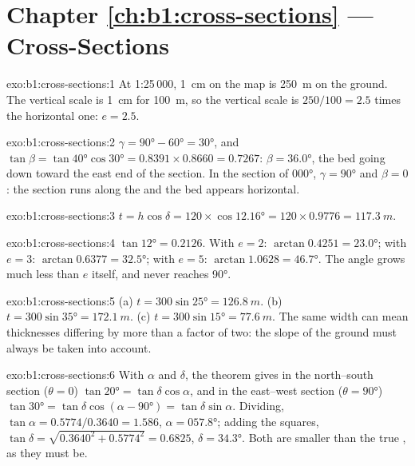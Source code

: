 \section*{Chapter \ref{ch:b1:cross-sections} --- Cross-Sections}

\begin{solution}{exo:b1:cross-sections:1}
At 1:25\,000, \qty{1}{cm} on the map is \qty{250}{m} on the ground. The
vertical scale is \qty{1}{cm} for \qty{100}{m}, so the vertical scale is
$250/100 = 2.5$ times the horizontal one: $e = 2.5$.
\end{solution}

\begin{solution}{exo:b1:cross-sections:2}
$\gamma = \ang{90} - \ang{60} = \ang{30}$, and $\tan\beta = \tan\ang{40}
\cos\ang{30} = 0.8391\times0.8660 = 0.7267$: $\beta = \ang{36.0}$, the bed
going down toward the east end of the section. In the section of 
\ang{000}, $\gamma = \ang{90}$ and $\beta = 0$: the section runs along the
 and the bed appears horizontal.
\end{solution}

\begin{solution}{exo:b1:cross-sections:3}
$t = h\cos\delta = 120\times\cos\ang{12.16} = 120\times0.9776 =
\qty{117.3}{m}$.
\end{solution}

\begin{solution}{exo:b1:cross-sections:4}
$\tan\ang{12} = 0.2126$. With $e = 2$: $\arctan 0.4251 = \ang{23.0}$; with
$e = 3$: $\arctan 0.6377 = \ang{32.5}$; with $e = 5$: $\arctan 1.0628 =
\ang{46.7}$. The angle grows much less than $e$ itself, and never reaches
\ang{90}.
\end{solution}

\begin{solution}{exo:b1:cross-sections:5}
(a) $t = 300\sin\ang{25} = \qty{126.8}{m}$. (b) $t = 300\sin\ang{35} =
\qty{172.1}{m}$. (c) $t = 300\sin\ang{15} = \qty{77.6}{m}$. The same 
width can mean thicknesses differing by more than a factor of two: the
slope of the ground must always be taken into account.
\end{solution}

\begin{solution}{exo:b1:cross-sections:6}
With  $\alpha$ and  $\delta$, the theorem gives in the
north--south section ($\theta = 0$) $\tan\ang{20} = \tan\delta\cos\alpha$,
and in the east--west section ($\theta = \ang{90}$) $\tan\ang{30} =
\tan\delta\cos(\alpha - \ang{90}) = \tan\delta\sin\alpha$. Dividing,
$\tan\alpha = 0.5774/0.3640 = 1.586$, $\alpha = \ang{057.8}$; adding the
squares, $\tan\delta = \sqrt{0.3640^2 + 0.5774^2} = 0.6825$, $\delta =
\ang{34.3}$. Both  are smaller than the true , as they must
be.
\end{solution}

